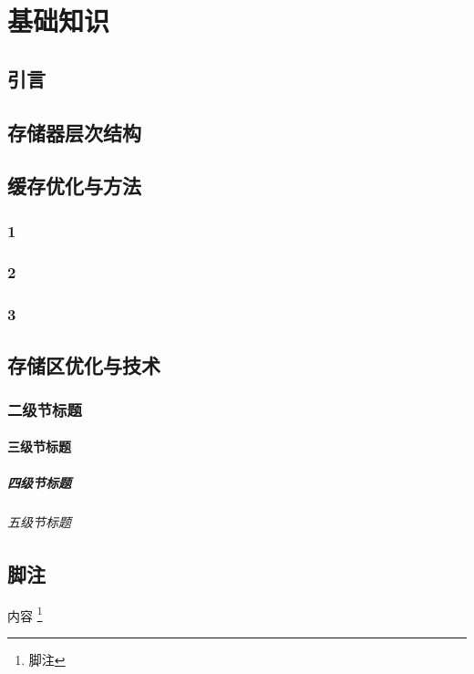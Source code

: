 
\chapter{基础知识}

\section{引言}
\section{存储器层次结构}
\section{缓存优化与方法}

\subsection{1}
\subsection{2}
\subsection{3}
\section{存储区优化与技术}

\subsection{二级节标题}

\subsubsection{三级节标题}

\paragraph{四级节标题}

\subparagraph{五级节标题}



\section{脚注}
内容
\footnote{脚注}
